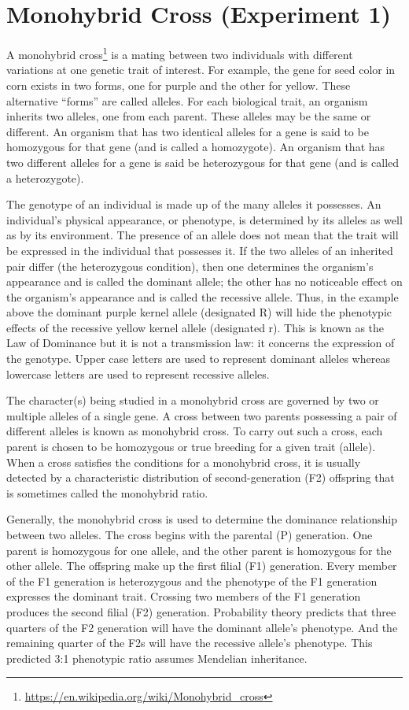 \documentclass[]{book}
\let\rmarkdownfootnote\footnote%
\def\footnote{\protect\rmarkdownfootnote}
\renewcommand{\href}[2]{#2\footnote{\url{#1}}}
\begin{document}
\section{Monohybrid Cross (Experiment
1)}\label{monohybrid-cross-experiment-1}

A \href{https://en.wikipedia.org/wiki/Monohybrid_cross}{monohybrid
cross} is a mating between two individuals with different variations at
one genetic trait of interest. For example, the gene for seed color in
corn exists in two forms, one for purple and the other for yellow. These
alternative ``forms'' are called alleles. For each biological trait, an
organism inherits two alleles, one from each parent. These alleles may
be the same or different. An organism that has two identical alleles for
a gene is said to be homozygous for that gene (and is called a
homozygote). An organism that has two different alleles for a gene is
said be heterozygous for that gene (and is called a heterozygote).

The genotype of an individual is made up of the many alleles it
possesses. An individual's physical appearance, or phenotype, is
determined by its alleles as well as by its environment. The presence of
an allele does not mean that the trait will be expressed in the
individual that possesses it. If the two alleles of an inherited pair
differ (the heterozygous condition), then one determines the organism's
appearance and is called the dominant allele; the other has no
noticeable effect on the organism's appearance and is called the
recessive allele. Thus, in the example above the dominant purple kernel
allele (designated R) will hide the phenotypic effects of the recessive
yellow kernel allele (designated r). This is known as the Law of
Dominance but it is not a transmission law: it concerns the expression
of the genotype. Upper case letters are used to represent dominant
alleles whereas lowercase letters are used to represent recessive
alleles.

The character(s) being studied in a monohybrid cross are governed by two
or multiple alleles of a single gene. A cross between two parents
possessing a pair of different alleles is known as monohybrid cross. To
carry out such a cross, each parent is chosen to be homozygous or true
breeding for a given trait (allele). When a cross satisfies the
conditions for a monohybrid cross, it is usually detected by a
characteristic distribution of second-generation (F2) offspring that is
sometimes called the monohybrid ratio.

Generally, the monohybrid cross is used to determine the dominance
relationship between two alleles. The cross begins with the parental (P)
generation. One parent is homozygous for one allele, and the other
parent is homozygous for the other allele. The offspring make up the
first filial (F1) generation. Every member of the F1 generation is
heterozygous and the phenotype of the F1 generation expresses the
dominant trait. Crossing two members of the F1 generation produces the
second filial (F2) generation. Probability theory predicts that three
quarters of the F2 generation will have the dominant allele's phenotype.
And the remaining quarter of the F2s will have the recessive allele's
phenotype. This predicted 3:1 phenotypic ratio assumes Mendelian
inheritance.
\end{document}
